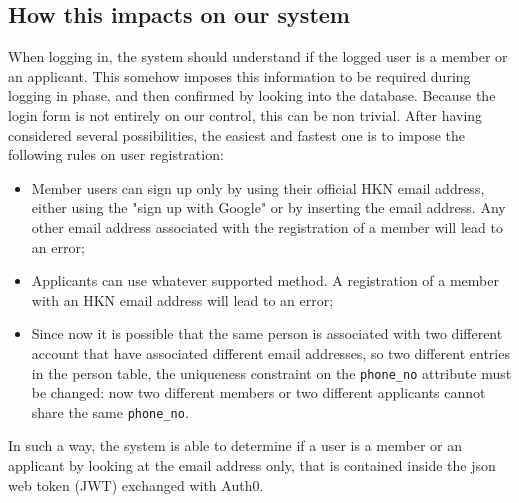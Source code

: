 \subsection{How this impacts on our system}
When logging in, the system should understand if the logged user is a member or an applicant. This somehow imposes this information to be required during logging in phase, and then confirmed by looking into the database. Because the login form is not entirely on our control, this can be non trivial.
After having considered several possibilities, the easiest and fastest one is to impose the following rules on user registration:
\begin{itemize}
	\item Member users can sign up only by using their official HKN email address, either using the "sign up with Google" or by inserting the email address. Any other email address associated with the registration of a member will lead to an error;
	\item Applicants can use whatever supported method. A registration of a member with an HKN email address will lead to an error;
	\item Since now it is possible that the same person is associated with two different account that have associated different email addresses, so two different entries in the person table, the uniqueness constraint on the \texttt{phone\_no} attribute must be changed: now two different members or two different applicants cannot share the same \texttt{phone\_no}.
\end{itemize}
In such a way, the system is able to determine if a user is a member or an applicant by looking at the email address only, that is contained inside the json web token (JWT) exchanged with Auth0.